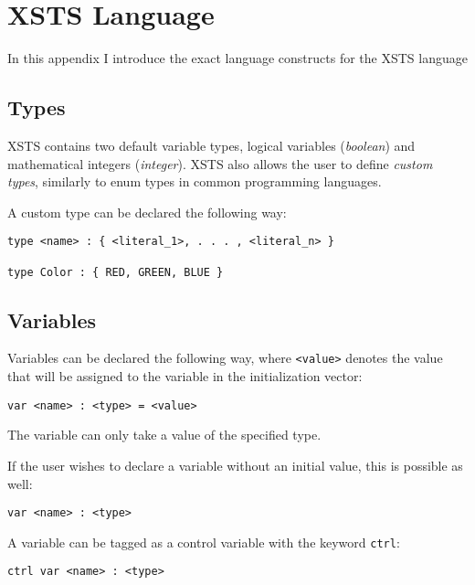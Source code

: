 \section{XSTS Language}\label{sec:xsts_language}

In this appendix I introduce the exact language constructs for the XSTS language 

\subsection{Types}

XSTS contains two default variable types, logical variables (\emph{boolean}) and mathematical integers (\emph{integer}). XSTS also allows the user to define \emph{custom types}, similarly to enum types in common programming languages.

A custom type can be declared the following way:

\begin{lstlisting}[language=xsts]
type <name> : { <literal_1>, . . . , <literal_n> }

type Color : { RED, GREEN, BLUE }
\end{lstlisting}

\subsection{Variables}

Variables can be declared the following way, where \verb|<value>| denotes the value that will be assigned to the variable in the initialization vector:

\begin{lstlisting}[language=xsts]
var <name> : <type> = <value>
\end{lstlisting}

The variable can only take a value of the specified type.

If the user wishes to declare a variable without an initial value, this is possible as well:

\begin{lstlisting}[language=xsts]
var <name> : <type>
\end{lstlisting}

A variable can be tagged as a control variable with the keyword \verb|ctrl|:

\begin{lstlisting}[language=xsts]
ctrl var <name> : <type>
\end{lstlisting}

